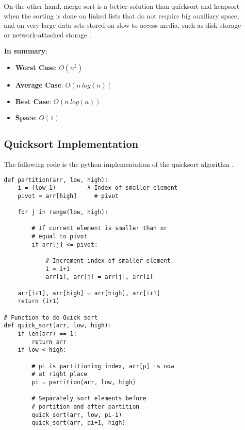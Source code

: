 On the other hand, merge sort is a better solution than quicksort and heapsort \cite{wikiheapsort} when the sorting is done on linked lists that do not require big auxiliary space, and on very large data sets stored on slow-to-access media, such as disk storage or network-attached storage \cite{wikiqicksort}.

\textbf{In summary}:
\begin{itemize}
\item \textbf{Worst Case}: \(O(n^{2})\)
\item \textbf{Average Case}: \(O(n\ log(n))\)
\item \textbf{Best Case}: \(O(n\ log(n))\)
\item \textbf{Space}: \(O(1)\)
\end{itemize}

\subsection{Quicksort Implementation}
The following code is the python implementation of the quicksort algorithm \cite{quicksortcode}.
\begin{lstlisting}[firstnumber=1, caption={Quicksort python implementation.}]
def partition(arr, low, high): 
    i = (low-1)         # Index of smaller element 
    pivot = arr[high]     # pivot 
  
    for j in range(low, high): 
  
        # If current element is smaller than or 
        # equal to pivot 
        if arr[j] <= pivot: 
  
            # Increment index of smaller element 
            i = i+1
            arr[i], arr[j] = arr[j], arr[i] 
  
    arr[i+1], arr[high] = arr[high], arr[i+1] 
    return (i+1) 
    
# Function to do Quick sort   
def quick_sort(arr, low, high): 
    if len(arr) == 1: 
        return arr 
    if low < high: 
  
        # pi is partitioning index, arr[p] is now 
        # at right place 
        pi = partition(arr, low, high) 
  
        # Separately sort elements before 
        # partition and after partition 
        quick_sort(arr, low, pi-1) 
        quick_sort(arr, pi+1, high)
    
\end{lstlisting}

